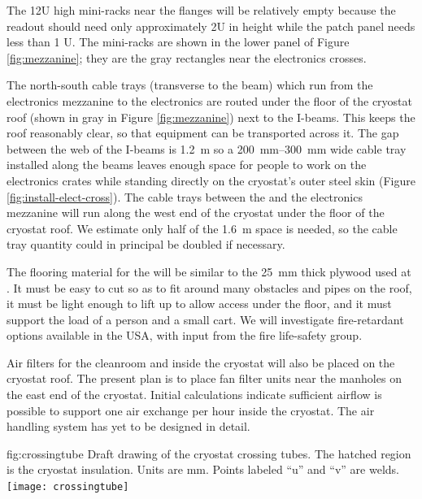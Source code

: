 The 12U high mini-racks near the \fdth flanges will be relatively empty because the  readout should need only approximately 2U in height while the  patch panel needs less than 1 U. The mini-racks are shown in the lower panel of Figure \ref{fig:mezzanine}; 
they are the gray rectangles near the electronics crosses.

The north-south cable trays (transverse to the beam) which run from the electronics mezzanine to the electronics \fdth are routed under the floor of the cryostat roof (shown in gray in Figure \ref{fig:mezzanine}) next to the 
I-beams. 
This keeps the roof reasonably clear, so that equipment can be transported across it.
The gap between the web of the I-beams is \SI{1.2}{m} so 
a \SIrange{200}{300}{mm} wide cable tray installed along the beams 
leaves enough space for people to work on the electronics crates while standing directly on the cryostat's outer steel skin (Figure \ref{fig:install-elect-cross}). 
The cable trays between the  and the electronics mezzanine will run along the west end of the cryostat under the floor of the cryostat roof. 
We estimate only half of the \SI{1.6}{m} space is needed, so the cable tray quantity could in principal be doubled if necessary. 

The flooring material for the 
will be similar to the \SI{25}{mm} thick plywood used at . 
It must be easy to cut so as to fit around many obstacles and pipes on the roof, it must be light enough to lift up to allow access under the floor, and it must support the load of a person and a small cart. 
We will investigate fire-retardant options available in the USA, with input from the  fire life-safety group. 

Air filters for the cleanroom and inside the cryostat will also be placed on the cryostat roof. The present plan is to place fan filter units near the manholes on the east end of the cryostat. Initial calculations indicate sufficient airflow is possible to support one air exchange per hour inside the cryostat. The air handling system has yet to be designed in detail.


\begin{dunefigure}{fig:crossingtube}
  {Draft drawing of the cryostat crossing tubes. The hatched region is the cryostat insulation. Units are mm. Points labeled ``u'' and ``v'' are welds. }
\texttt{[image: crossingtube]}
\end{dunefigure}
 
